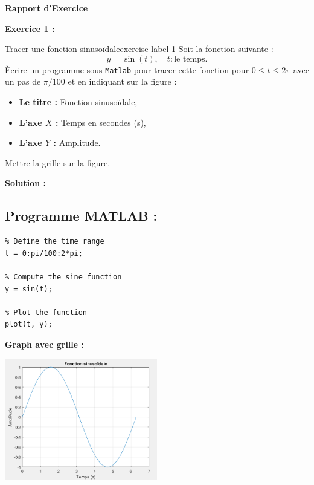 \documentclass{article}
\begin{document}
\begin{Large}
    \textsf{\textbf{Rapport d'Exercice}}
    
    \vspace{1ex}
\end{Large}

\vspace{2ex}

\textsf{\textbf{Exercice 1 :}}
\begin{problem}{Tracer une fonction sinuso\"idale}{exercise-label-1}
Soit la fonction suivante :
\[ y = \sin(t), \quad t : \text{le temps.} \]
\`Ecrire un programme sous \texttt{Matlab} pour tracer cette fonction pour \( 0 \leq t \leq 2\pi \) avec un pas de \( \pi/100 \) et en indiquant sur la figure :
\begin{itemize}
    \item \textbf{Le titre :} Fonction sinuso\"idale,
    \item \textbf{L'axe \( X \) :} Temps en secondes (s),
    \item \textbf{L'axe \( Y \) :} Amplitude.
\end{itemize}
Mettre la grille sur la figure.
\end{problem}

\textsf{\textbf{Solution :}}

\subsection*{Programme MATLAB :}
\begin{lstlisting}
% Define the time range
t = 0:pi/100:2*pi;               

% Compute the sine function
y = sin(t);                      

% Plot the function
plot(t, y);                      
\end{lstlisting}

\textsf{\textbf{Graph avec grille :}}


\begin{center}
\includegraphics[width=0.5\textwidth]{EXERCICE 1 GRAPH.png}
\end{center}
\end{document}
